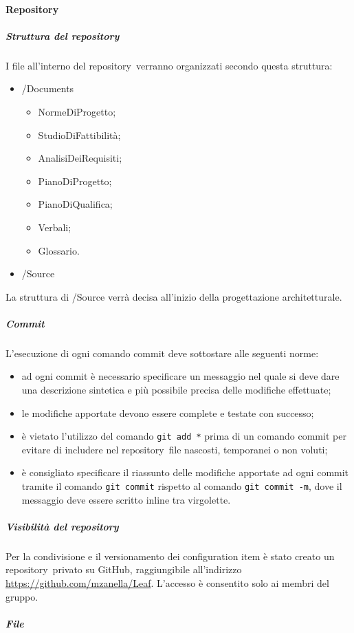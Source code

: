 \documentclass[../NormeProgetto.tex]{subfiles}
\begin{document}
		\paragraph{Repository}	
			\subparagraph{Struttura del repository}
				I file all'interno del repository\g\ verranno organizzati secondo questa struttura:
				\begin{itemize}
					\item /Documents
					\begin{itemize}
						\item NormeDiProgetto;
						\item StudioDiFattibilità;
						\item AnalisiDeiRequisiti;
						\item PianoDiProgetto;
						\item PianoDiQualifica;
						\item Verbali;
						\item Glossario.
					\end{itemize}
					\item /Source
				\end{itemize}
				La struttura di /Source verrà decisa all'inizio della progettazione architetturale.
			\subparagraph{Commit}
				L'esecuzione di ogni comando commit deve sottostare alle seguenti norme:
				\begin{itemize}
					\item ad ogni commit è necessario specificare un messaggio nel quale si deve dare una descrizione sintetica e più possibile precisa delle modifiche effettuate;
					\item le modifiche apportate devono essere complete e testate con successo;
					\item è vietato l'utilizzo del comando \texttt{git add *} prima di un comando commit per evitare di includere nel repository\g\ file nascosti, temporanei o non voluti;
					\item è consigliato specificare il riassunto delle modifiche apportate ad ogni commit tramite il comando \texttt{git commit} rispetto al comando \texttt{git commit -m}, dove il messaggio deve essere scritto inline tra virgolette.
				\end{itemize}
			\subparagraph{Visibilità del repository}
				Per la condivisione e il versionamento dei configuration item è stato creato un repository\g\ privato su GitHub\g, raggiungibile all'indirizzo \url{https://github.com/mzanella/Leaf}. L'accesso è consentito solo ai membri del gruppo.	
			\subparagraph{File}	
\end{document}

